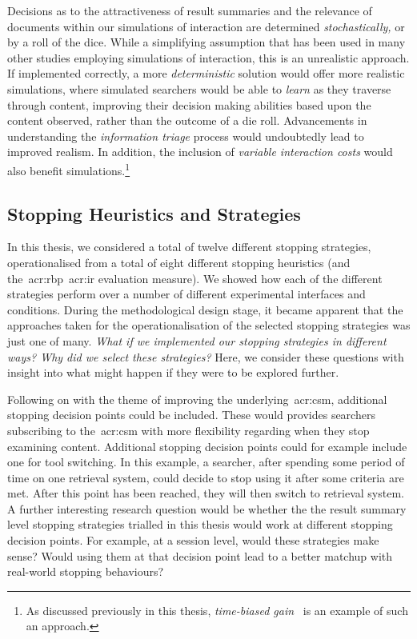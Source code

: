  Decisions as to the attractiveness of result summaries and the relevance of documents within our simulations of interaction are determined \emph{stochastically,} or by a roll of the dice. While a simplifying assumption that has been used in many other studies employing simulations of interaction, this is an unrealistic approach. If implemented correctly, a more \emph{deterministic} solution would offer more realistic simulations, where simulated searchers would be able to \emph{learn} as they traverse through content, improving their decision making abilities based upon the content observed, rather than the outcome of a die roll. Advancements in understanding the \emph{information triage} process would undoubtedly lead to improved realism. In addition, the inclusion of \emph{variable interaction costs} would also benefit simulations.\footnote{As discussed previously in this thesis, \emph{time-biased gain}~\citep{smucker2012tbg} is an example of such an approach.}

\subsection{Stopping Heuristics and Strategies}\label{sec:conclusions:future:stopping}
In this thesis, we considered a total of twelve different stopping strategies, operationalised from a total of eight different stopping heuristics (and the~\gls{acr:rbp}~\gls{acr:ir} evaluation measure). We showed how each of the different strategies perform over a number of different experimental interfaces and conditions. During the methodological design stage, it became apparent that the approaches taken for the operationalisation of the selected stopping strategies was just one of many. \emph{What if we implemented our stopping strategies in different ways? Why did we select these strategies?} Here, we consider these questions with insight into what might happen if they were to be explored further.

Following on with the theme of improving the underlying~\gls{acr:csm}, additional stopping decision points could be included. These would provides searchers subscribing to the~\gls{acr:csm} with more flexibility regarding when they stop examining content. Additional stopping decision points could for example include one for tool switching. In this example, a searcher, after spending some period of time on one retrieval system, could decide to stop using it after some criteria are met. After this point has been reached, they will then switch to retrieval system. A further interesting research question would be whether the the result summary level stopping strategies trialled in this thesis would work at different stopping decision points. For example, at a session level, would these strategies make sense? Would using them at that decision point lead to a better matchup with real-world stopping behaviours?


